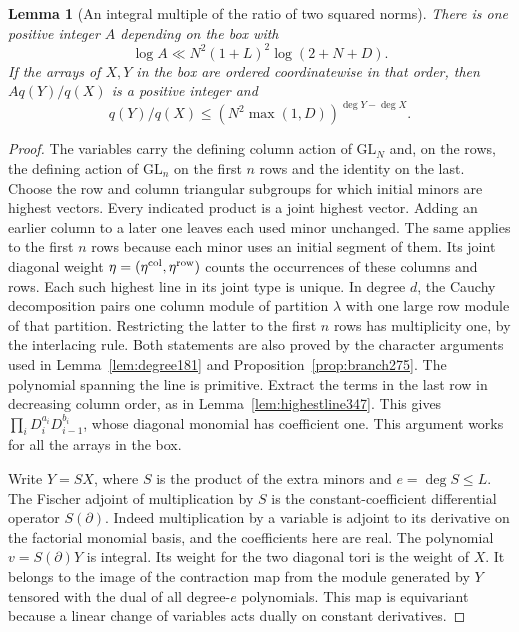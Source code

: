 \documentclass[a4paper,11pt]{article}
\newtheorem{lemma}[proposition]{Lemma}
\theoremstyle{definition}
\theoremstyle{remark}
\numberwithin{equation}{section}
\begin{document}
\begin{lemma}[An integral multiple of the ratio of two squared norms]\leavevmode
\label{lem:contractwindow348}
There is one positive integer \(A\) depending on the box with
\[
       \log A\ll N^2(1+L)^2\log(2+N+D).
\]
If the arrays of \(X,Y\) in the box are ordered coordinatewise
in that order, then \(Aq(Y)/q(X)\) is a positive integer and
\[
             q(Y)/q(X)\le (N^2\max(1,D))^{\deg Y-\deg X}.
\]
\end{lemma}
\begin{proof}
The variables carry the defining column action of \(\mathrm{GL}_N\)
and, on the rows, the defining action of \(\mathrm{GL}_n\) on the
first \(n\) rows and the identity on the last. Choose the row and
column triangular subgroups for which initial minors are highest
vectors. Every indicated product is a joint highest vector. Adding an earlier
column to a later one leaves each used minor unchanged. The same applies to the first \(n\) rows because each
minor uses an initial segment of them. Its joint diagonal weight
\(\eta=(\eta^{\rm col},\eta^{\rm row})\) counts the occurrences
of these columns and rows. Each such highest line in its joint
type is unique. In degree \(d\), the Cauchy decomposition pairs
one column module of partition \(\lambda\) with one large row
module of that partition. Restricting the latter to the first
\(n\) rows has multiplicity one, by the interlacing rule. Both
statements are also proved by the character arguments used in
Lemma~\ref{lem:degree181} and Proposition~\ref{prop:branch275}.
The polynomial spanning the line is primitive. Extract the terms
in the last row in decreasing column order, as in
Lemma~\ref{lem:highestline347}. This gives
\(\prod_iD_i^{a_i}D_{i-1}^{b_i}\), whose diagonal monomial has
coefficient one. This argument works for all the arrays in the box.

Write \(Y=SX\), where \(S\) is the product of the extra minors
and \(e=\deg S\le L\). The Fischer adjoint of multiplication by
\(S\) is the constant-coefficient differential operator
\(S(\partial)\). Indeed multiplication by a variable is adjoint
to its derivative on the factorial monomial basis, and the
coefficients here are real. The polynomial \(v=S(\partial)Y\)
is integral. Its weight for the two diagonal tori is the weight
of \(X\). It belongs to the image of the contraction map from
the module generated by \(Y\) tensored with the dual of all
degree-\(e\) polynomials. This map is equivariant because a
linear change of variables acts dually on constant derivatives.


\end{proof}
\end{document}
